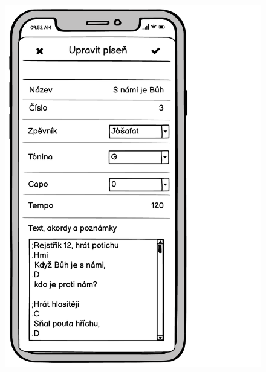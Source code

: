 \begin{figure}
    \includegraphics[width=\textwidth/3 - 2pt]{images/3-navrh/3-7-dialog-uprava.pdf}

\end{figure}
